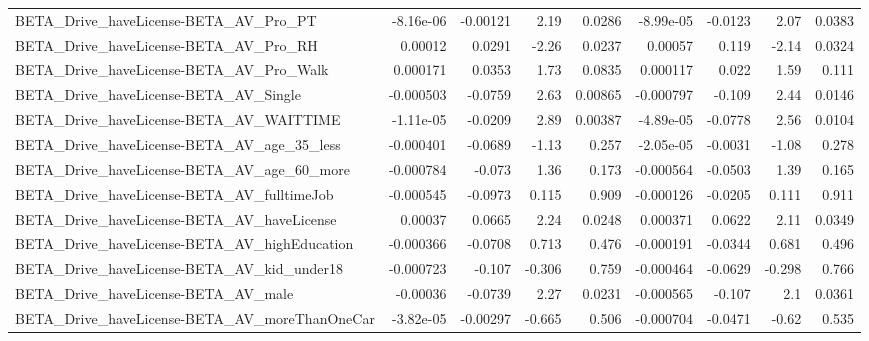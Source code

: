 \begin{tabular}{lrrrrrrrr}
BETA\_Drive\_haveLicense-BETA\_AV\_Pro\_PT              &   -8.16e-06 &     -0.00121 &      2.19 &   0.0286 &  -8.99e-05 &     -0.0123 &         2.07 &        0.0383 \\
BETA\_Drive\_haveLicense-BETA\_AV\_Pro\_RH              &     0.00012 &       0.0291 &     -2.26 &   0.0237 &    0.00057 &       0.119 &        -2.14 &        0.0324 \\
BETA\_Drive\_haveLicense-BETA\_AV\_Pro\_Walk            &    0.000171 &       0.0353 &      1.73 &   0.0835 &   0.000117 &       0.022 &         1.59 &         0.111 \\
BETA\_Drive\_haveLicense-BETA\_AV\_Single              &   -0.000503 &      -0.0759 &      2.63 &  0.00865 &  -0.000797 &      -0.109 &         2.44 &        0.0146 \\
BETA\_Drive\_haveLicense-BETA\_AV\_WAITTIME            &   -1.11e-05 &      -0.0209 &      2.89 &  0.00387 &  -4.89e-05 &     -0.0778 &         2.56 &        0.0104 \\
BETA\_Drive\_haveLicense-BETA\_AV\_age\_35\_less         &   -0.000401 &      -0.0689 &     -1.13 &    0.257 &  -2.05e-05 &     -0.0031 &        -1.08 &         0.278 \\
BETA\_Drive\_haveLicense-BETA\_AV\_age\_60\_more         &   -0.000784 &       -0.073 &      1.36 &    0.173 &  -0.000564 &     -0.0503 &         1.39 &         0.165 \\
BETA\_Drive\_haveLicense-BETA\_AV\_fulltimeJob         &   -0.000545 &      -0.0973 &     0.115 &    0.909 &  -0.000126 &     -0.0205 &        0.111 &         0.911 \\
BETA\_Drive\_haveLicense-BETA\_AV\_haveLicense         &     0.00037 &       0.0665 &      2.24 &   0.0248 &   0.000371 &      0.0622 &         2.11 &        0.0349 \\
BETA\_Drive\_haveLicense-BETA\_AV\_highEducation       &   -0.000366 &      -0.0708 &     0.713 &    0.476 &  -0.000191 &     -0.0344 &        0.681 &         0.496 \\
BETA\_Drive\_haveLicense-BETA\_AV\_kid\_under18         &   -0.000723 &       -0.107 &    -0.306 &    0.759 &  -0.000464 &     -0.0629 &       -0.298 &         0.766 \\
BETA\_Drive\_haveLicense-BETA\_AV\_male                &    -0.00036 &      -0.0739 &      2.27 &   0.0231 &  -0.000565 &      -0.107 &          2.1 &        0.0361 \\
BETA\_Drive\_haveLicense-BETA\_AV\_moreThanOneCar      &   -3.82e-05 &     -0.00297 &    -0.665 &    0.506 &  -0.000704 &     -0.0471 &        -0.62 &         0.535 \\

\end{tabular}
